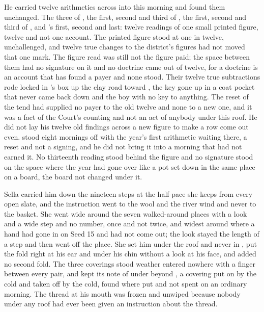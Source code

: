 He carried twelve arithmetics across into this morning and found them unchanged. The three of , the first, second and third of , the first, second and third of , and 's first, second and last: twelve readings of one small printed figure, twelve and not one account. The printed figure stood at one in twelve, unchallenged, and twelve true changes to the district's figures had not moved that one mark. The figure read was still not the figure paid; the space between them had no signature on it and no doctrine came out of twelve, for a doctrine is an account that has found a payer and none stood. Their twelve true subtractions rode locked in 's box up the clay road toward , the key gone up in a coat pocket that never came back down and the boy with no key to anything. The reset of the tend had supplied no payer to the old twelve and none to a new one, and it was a fact of the Court's counting and not an act of anybody under this roof. He did not lay his twelve old findings across a new figure to make a row come out even.  stood eight mornings off with the year's first arithmetic waiting there, a reset and not a signing, and he did not bring it into a morning that had not earned it. No thirteenth reading stood behind the figure and no signature stood on the space where the year had gone over like a pot set down in the same place on a board, the board not changed under it.

Sella carried him down the nineteen steps at the half-pace she keeps from every open slate, and the instruction went to the wool and the river wind and never to the basket. She went wide around the seven walked-around places with a look and a wide step and no number, once and not twice, and widest around  where a hand had gone in on Seed 15 and had not come out; the look stayed the length of a step and then went off the place. She set him under the roof and never in , put the fold right at his ear and under his chin without a look at his face, and added no second fold. The three coverings stood weather entered nowhere with a finger between every pair, and  kept its note of  under  beyond , a covering put on by the cold and taken off by the cold, found where put and not spent on an ordinary morning. The thread at his mouth was frozen and unwiped because nobody under any roof had ever been given an instruction about the thread.

